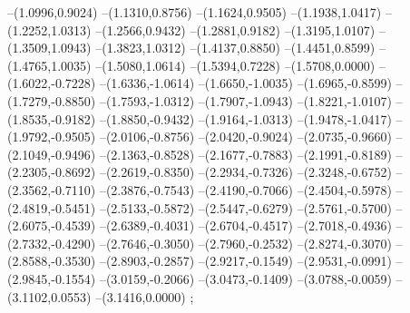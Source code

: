 {--(1.0996,0.9024)
--(1.1310,0.8756)
--(1.1624,0.9505)
--(1.1938,1.0417)
--(1.2252,1.0313)
--(1.2566,0.9432)
--(1.2881,0.9182)
--(1.3195,1.0107)
--(1.3509,1.0943)
--(1.3823,1.0312)
--(1.4137,0.8850)
--(1.4451,0.8599)
--(1.4765,1.0035)
--(1.5080,1.0614)
--(1.5394,0.7228)
--(1.5708,0.0000)
--(1.6022,-0.7228)
--(1.6336,-1.0614)
--(1.6650,-1.0035)
--(1.6965,-0.8599)
--(1.7279,-0.8850)
--(1.7593,-1.0312)
--(1.7907,-1.0943)
--(1.8221,-1.0107)
--(1.8535,-0.9182)
--(1.8850,-0.9432)
--(1.9164,-1.0313)
--(1.9478,-1.0417)
--(1.9792,-0.9505)
--(2.0106,-0.8756)
--(2.0420,-0.9024)
--(2.0735,-0.9660)
--(2.1049,-0.9496)
--(2.1363,-0.8528)
--(2.1677,-0.7883)
--(2.1991,-0.8189)
--(2.2305,-0.8692)
--(2.2619,-0.8350)
--(2.2934,-0.7326)
--(2.3248,-0.6752)
--(2.3562,-0.7110)
--(2.3876,-0.7543)
--(2.4190,-0.7066)
--(2.4504,-0.5978)
--(2.4819,-0.5451)
--(2.5133,-0.5872)
--(2.5447,-0.6279)
--(2.5761,-0.5700)
--(2.6075,-0.4539)
--(2.6389,-0.4031)
--(2.6704,-0.4517)
--(2.7018,-0.4936)
--(2.7332,-0.4290)
--(2.7646,-0.3050)
--(2.7960,-0.2532)
--(2.8274,-0.3070)
--(2.8588,-0.3530)
--(2.8903,-0.2857)
--(2.9217,-0.1549)
--(2.9531,-0.0991)
--(2.9845,-0.1554)
--(3.0159,-0.2066)
--(3.0473,-0.1409)
--(3.0788,-0.0059)
--(3.1102,0.0553)
--(3.1416,0.0000)
;}
